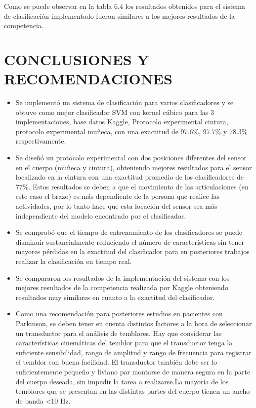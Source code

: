 \documentclass[11pt]{report}
\begin{document}
Como se puede observar en la tabla 6.4 los resultados obtenidos para el sistema de clasificación implementado fueron similares a los mejores resultados de la competencia.

\chapter{CONCLUSIONES Y RECOMENDACIONES}

\begin{itemize}
\item Se implementó un sistema de clasificación para varios clasificadores y se obtuvo como mejor clasificador SVM con kernel cúbico para las 3 implementaciones, base datos Kaggle, Protocolo experimental cintura, protocolo experimental muñeca, con una exactitud de 97.6\%, 97.7\% y 78.3\% respectivamente.
\item Se diseñó un protocolo experimental con dos posiciones diferentes del sensor en el cuerpo (muñeca y cintura), obteniendo mejores resultados para el sensor localizado en la cintura con una exactitud promedio de los clasificadores de 77\%. Estos resultados se deben a que el movimiento de las articulaciones (en este caso el brazo) es más dependiente de la persona que realice las actividades, por lo tanto hace que esta locación del sensor sea más independiente del modelo encontrado por el clasificador.
\item Se comprobó que el tiempo de entrenamiento de los clasificadores se puede disminuir sustancialmente reduciendo el número de características sin tener mayores pérdidas en la exactitud del clasificador para en posteriores trabajos realizar la clasificación en tiempo real.
\item Se compararon los resultados de la implementación del sistema con los mejores resultados de la competencia realizada por Kaggle obteniendo resultados muy similares en cuanto a la exactitud del clasificador. 
\item Como una recomendación para posteriores estudios en pacientes con Parkinson, se deben tener en cuenta distintos factores a la hora de seleccionar un transductor para el análisis de temblores. Hay que considerar las características cinemáticas del temblor para que el transductor tenga la suficiente sensibilidad, rango de amplitud y rango de frecuencia para registrar el temblor con buena facilidad. El transductor también debe ser lo suficientemente pequeño y liviano par montarse de manera segura en la parte del cuerpo deseada, sin impedir la tarea a realizarse.La mayoría de los temblores que se presentan en las distintas partes del cuerpo tienen un ancho de banda <10 Hz.\cite{elble2016using}
\end{itemize}
\end{document}
